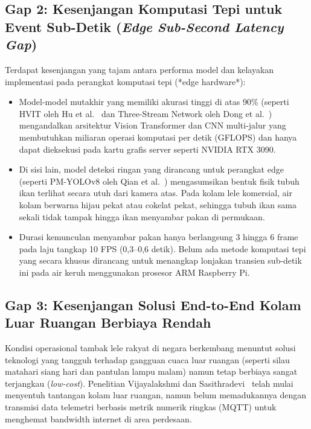 \subsection{Gap 2: Kesenjangan Komputasi Tepi untuk Event Sub-Detik (\textit{Edge Sub-Second Latency Gap})}
Terdapat kesenjangan yang tajam antara performa model dan kelayakan implementasi pada perangkat komputasi tepi (*edge hardware*):
\begin{itemize}
    \item Model-model mutakhir yang memiliki akurasi tinggi di atas 90\% (seperti HVIT oleh Hu et al.~\cite{Hu2026} dan Three-Stream Network oleh Dong et al.~\cite{Dong2024}) mengandalkan arsitektur Vision Transformer dan CNN multi-jalur yang membutuhkan miliaran operasi komputasi per detik (GFLOPS) dan hanya dapat dieksekusi pada kartu grafis server seperti NVIDIA RTX 3090.
    \item Di sisi lain, model deteksi ringan yang dirancang untuk perangkat edge (seperti PM-YOLOv8 oleh Qian et al.~\cite{Qian2025}) mengasumsikan bentuk fisik tubuh ikan terlihat secara utuh dari kamera atas. Pada kolam lele komersial, air kolam berwarna hijau pekat atau cokelat pekat, sehingga tubuh ikan sama sekali tidak tampak hingga ikan menyambar pakan di permukaan.
    \item Durasi kemunculan menyambar pakan hanya berlangsung 3 hingga 6 frame pada laju tangkap 10 FPS (0,3--0,6 detik). Belum ada metode komputasi tepi yang secara khusus dirancang untuk menangkap lonjakan transien sub-detik ini pada air keruh menggunakan prosesor ARM Raspberry Pi.
\end{itemize}

\subsection{Gap 3: Kesenjangan Solusi End-to-End Kolam Luar Ruangan Berbiaya Rendah}
Kondisi operasional tambak lele rakyat di negara berkembang menuntut solusi teknologi yang tangguh terhadap gangguan cuaca luar ruangan (seperti silau matahari siang hari dan pantulan lampu malam) namun tetap berbiaya sangat terjangkau (\textit{low-cost}). Penelitian Vijayalakshmi dan Sasithradevi~\cite{Vijayalakshmi2025} telah mulai menyentuh tantangan kolam luar ruangan, namun belum memadukannya dengan transmisi data telemetri berbasis metrik numerik ringkas (MQTT) untuk menghemat bandwidth internet di area perdesaan.
